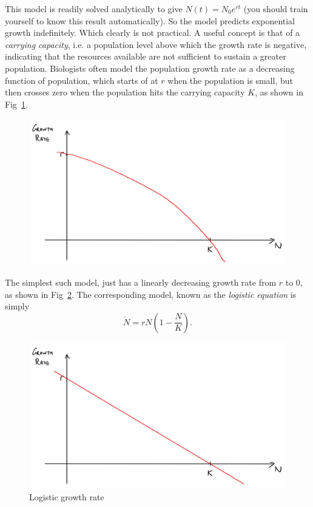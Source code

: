 This model is readily solved analytically to give $N(t) = N_0 e^{rt}$ (you
should train yourself to know this result automatically). So the model
predicts exponential growth indefinitely. Which clearly is not practical.
A useful concept is that of a \emph{carrying capacity}, i.e. a population
level above which the growth rate is negative, indicating that the
resources available are not sufficient to sustain a greater population.
Biologists often model the population growth rate as a decreasing function
of population, which starts of at $r$ when the population is small, but
then crosses zero when the population hits the carrying capacity $K$, as
shown in Fig~\ref{fig:carryingcapacity}.

\begin{figure}[h]
  \centering
  \includegraphics[width=\linewidth]{figs/carryingcapacity}
  \caption{}
  \label{fig:carryingcapacity}
\end{figure}

The simplest such model, just has a linearly decreasing growth rate from
$r$ to $0$, as shown in Fig~\ref{fig:logisticgrowth}. The corresponding
model, known as the \emph{logistic equation} is simply
\begin{equation}\label{eq:logistic}
    \dot N = rN \left(1 - \frac{N}{K}\right).
\end{equation}
\begin{figure}[h]
  \centering
  \includegraphics[width=\linewidth]{figs/logisticgrowth}
  \caption{Logistic growth rate}
  \label{fig:logisticgrowth}
\end{figure}

